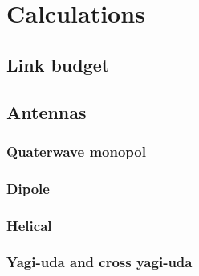 \chapter{Calculations}

\section{Link budget}

\section{Antennas}
\subsection{Quaterwave monopol}
\subsection{Dipole}
\subsection{Helical}
\subsection{Yagi-uda and cross yagi-uda}
